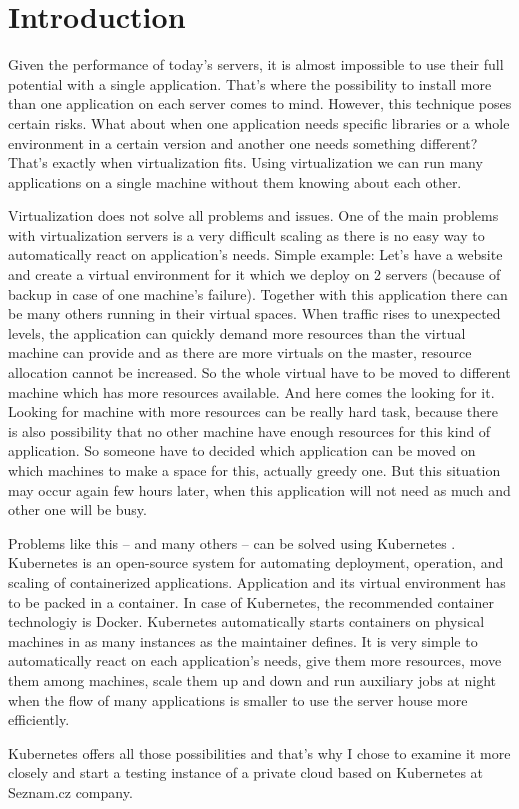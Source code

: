 \chapter{Introduction}

Given the performance of today’s servers, it is almost impossible to use their full potential with a single application. That’s where the possibility to install more than one application on each server comes to mind. However, this technique poses certain risks. What about when one application needs specific libraries or a whole environment in a certain version and another one needs something different? That’s exactly when virtualization fits. Using virtualization we can run many applications on a single machine without them knowing about each other.

Virtualization does not solve all problems and issues. One of the main problems with virtualization servers is a very difficult scaling as there is no easy way to automatically react on application’s needs. Simple example: Let’s have a website and create a virtual environment for it which we deploy on 2 servers (because of backup in case of one machine’s failure). Together with this application there can be many others running in their virtual spaces. When traffic rises to unexpected levels,  the application can quickly demand more resources than the virtual machine can provide and as there are more virtuals on the master, resource allocation cannot be increased. So the whole virtual have to be moved to different machine which has more resources available. And here comes the looking for it. Looking for machine with more resources can be really hard task, because there is also possibility that no other machine have enough resources for this kind of application. So someone have to decided which application can be moved on which machines to make a space for this, actually greedy one. But this situation may occur again few hours later, when this application will not need as much and other one will be busy.

Problems like this -- and many others -- can be solved using Kubernetes \cite{kubernetesio}. Kubernetes is an open-source system for automating deployment, operation, and scaling of containerized applications. Application and its virtual environment has to be packed in a container. In case of Kubernetes, the recommended container technologiy is Docker. Kubernetes automatically starts containers on physical machines in as many instances as the maintainer defines. It is very simple to automatically react on each application’s needs, give them more resources, move them among machines, scale them up and down and run auxiliary jobs at night when the flow of many applications is smaller to use the server house more efficiently.

Kubernetes offers all those possibilities and that’s why I chose to examine it more closely and start a testing instance of a private cloud based on Kubernetes at Seznam.cz company.